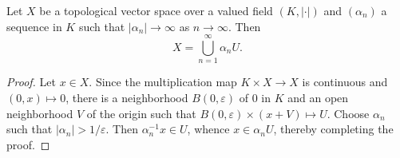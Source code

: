 \begin{lemma}
    Let $X$ be a topological vector space over a valued field $(K, |\cdot|)$ and $(\alpha_n)$ a sequence in $K$ such that $|\alpha_n|\to\infty$ as $n\to\infty$. Then 
    \begin{equation*}
        X = \bigcup_{n = 1}^\infty \alpha_n U.
    \end{equation*}
\end{lemma}
\begin{proof}
    Let $x\in X$. Since the multiplication map $K\times X\to X$ is continuous and $(0, x)\mapsto 0$, there is a neighborhood $B(0, \varepsilon)$ of $0$ in $K$ and an open neighborhood $V$ of the origin such that $B(0,\varepsilon)\times (x + V)\mapsto U$. Choose $\alpha_n$ such that $|\alpha_n| > 1/\varepsilon$. Then $\alpha_n^{-1} x\in U$, whence $x\in\alpha_n U$, thereby completing the proof.
\end{proof}

